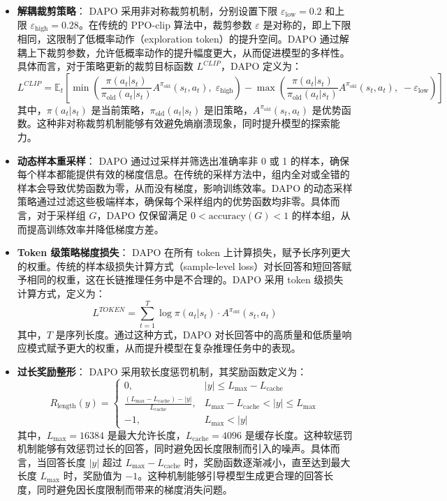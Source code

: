 \documentclass{pkuthesis}
\begin{document}
\begin{itemize}
    \item \textbf{解耦裁剪策略}：
    DAPO 采用非对称裁剪机制，分别设置下限 \( \varepsilon_{\text{low}} = 0.2 \) 和上限 \( \varepsilon_{\text{high}} = 0.28 \)。在传统的 PPO-clip 算法中，裁剪参数 \(\varepsilon\) 是对称的，即上下限相同，这限制了低概率动作（exploration token）的提升空间。DAPO 通过解耦上下裁剪参数，允许低概率动作的提升幅度更大，从而促进模型的多样性。具体而言，对于策略更新的裁剪目标函数 \(L^{CLIP}\)，DAPO 定义为：
    \[
    L^{CLIP} = \mathbb{E}_{t} \left[ \min \left( \frac{\pi(a_t|s_t)}{\pi_{\text{old}}(a_t|s_t)} A^{\pi_{\text{old}}}(s_t, a_t), \; \varepsilon_{\text{high}} \right) - \max \left( \frac{\pi(a_t|s_t)}{\pi_{\text{old}}(a_t|s_t)} A^{\pi_{\text{old}}}(s_t, a_t), \; -\varepsilon_{\text{low}} \right) \right]
    \]
    其中，\(\pi(a_t|s_t)\) 是当前策略，\(\pi_{\text{old}}(a_t|s_t)\) 是旧策略，\(A^{\pi_{\text{old}}}(s_t, a_t)\) 是优势函数。这种非对称裁剪机制能够有效避免熵崩溃现象，同时提升模型的探索能力。

    \item \textbf{动态样本重采样}：
    DAPO 通过过采样并筛选出准确率非 0 或 1 的样本，确保每个样本都能提供有效的梯度信息。在传统的采样方法中，组内全对或全错的样本会导致优势函数为零，从而没有梯度，影响训练效率。DAPO 的动态采样策略通过过滤这些极端样本，确保每个采样组内的优势函数均非零。具体而言，对于采样组 \(G\)，DAPO 仅保留满足 \(0 < \text{accuracy}(G) < 1\) 的样本组，从而提高训练效率并降低梯度方差。

    \item \textbf{Token 级策略梯度损失}：
    DAPO 在所有 token 上计算损失，赋予长序列更大的权重。传统的样本级损失计算方式（sample-level loss）对长回答和短回答赋予相同的权重，这在长链推理任务中是不合理的。DAPO 采用 token 级损失计算方式，定义为：
    \[
    L^{TOKEN} = \sum_{t=1}^{T} \log \pi(a_t|s_t) \cdot A^{\pi_{\text{old}}}(s_t, a_t)
    \]
    其中，\(T\) 是序列长度。通过这种方式，DAPO 对长回答中的高质量和低质量响应模式赋予更大的权重，从而提升模型在复杂推理任务中的表现。

    \item \textbf{过长奖励整形}：
    DAPO 采用软长度惩罚机制，其奖励函数定义为：
    \[
    R_{\text{length}}(y) = \begin{cases} 
    0, & |y| \leq L_{\text{max}} - L_{\text{cache}} \\ 
    \frac{(L_{\text{max}} - L_{\text{cache}}) - |y|}{L_{\text{cache}}}, & L_{\text{max}} - L_{\text{cache}} < |y| \leq L_{\text{max}} \\ 
    -1, & L_{\text{max}} < |y|
    \end{cases}
    \]
    其中，\(L_{\text{max}} = 16384\) 是最大允许长度，\(L_{\text{cache}} = 4096\) 是缓存长度。这种软惩罚机制能够有效惩罚过长的回答，同时避免因长度限制而引入的噪声。具体而言，当回答长度 \(|y|\) 超过 \(L_{\text{max}} - L_{\text{cache}}\) 时，奖励函数逐渐减小，直至达到最大长度 \(L_{\text{max}}\) 时，奖励值为 \(-1\)。这种机制能够引导模型生成更合理的回答长度，同时避免因长度限制而带来的梯度消失问题。
\end{itemize}
\end{document}
